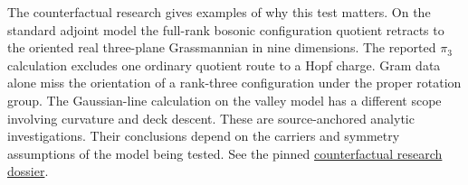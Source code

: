 The counterfactual research gives examples of why this test matters.
On the standard adjoint model the full-rank bosonic configuration
quotient retracts to the oriented real three-plane Grassmannian
in nine dimensions. The reported \(\pi_3\) calculation excludes
one ordinary quotient route to a Hopf charge. Gram data alone miss
the orientation of a rank-three configuration under the proper
rotation group. The Gaussian-line calculation on the valley model
has a different scope involving curvature and deck descent. These
are source-anchored analytic investigations. Their conclusions
depend on the carriers and symmetry assumptions of the model
being tested. See the pinned
\href{https://github.com/etblink/math/tree/15cf95aaf285333be4af9fbebb951542a563aed8/research/counterfactual-gut}{counterfactual research dossier}.
